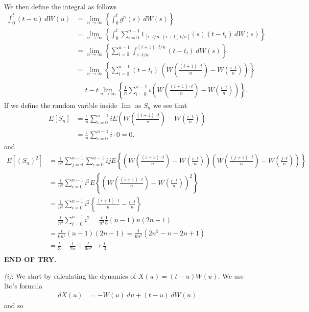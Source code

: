 \documentclass[a4paper,12pt,openany]{book}
\begin{document}
We then define the integral as follows
\begin{align*}
\int_0^t(t-u)\ dW(u)&=\lim_{n\to \infty}\left\{\int_0^tg^n(s)\ dW(s)\right\}\\
&=\lim_{n\to \infty}\left\{\int_0^t \sum_{i=0}^{n-1}1_{[i\cdot t/n,(i+1)t/n]}(s)(t-t_i)\ dW(s)\right\}\\
&=\lim_{n\to \infty}\left\{\sum_{i=0}^{n-1}\int_{i\cdot t/n}^{(i+1)\cdot t/n} (t-t_i)\ dW(s)\right\}\\
&=\lim_{n\to \infty}\left\{\sum_{i=0}^{n-1} (t-t_i)\ \left(W\left(\frac{(i+1)\cdot t}{n}\right)-W\left(\frac{i\cdot t}{n}\right)\right)\right\}\\
&=t-t\lim_{n\to \infty}\left\{\frac{1}{n}\sum_{i=0}^{n-1} i \left(W\left(\frac{(i+1)\cdot t}{n}\right)-W\left(\frac{i\cdot t}{n}\right)\right)\right\}.
\end{align*}
If we define the random varible inside \(\lim\) as \(S_n\) we see that
\begin{align*}
E[S_n]&=\frac{1}{n}\sum_{i=0}^{n-1}iE\left(W\left(\frac{(i+1)\cdot t}{n}\right)-W\left(\frac{i\cdot t}{n}\right)\right)\\
&=\frac{1}{n}\sum_{i=0}^{n-1}i\cdot0=0.
\end{align*}
and
\begin{align*}
E[(S_n)^2]&=\frac{1}{n^2}\sum_{j=0}^{n-1}\sum_{i=0}^{n-1}ijE\left\{\left(W\left(\frac{(i+1)\cdot t}{n}\right)-W\left(\frac{i\cdot t}{n}\right)\right)\left(W\left(\frac{(j+1)\cdot t}{n}\right)-W\left(\frac{j\cdot t}{n}\right)\right)\right\}\\
&=\frac{1}{n^2}\sum_{i=0}^{n-1}i^2E\left\{\left(W\left(\frac{(i+1)\cdot t}{n}\right)-W\left(\frac{i\cdot t}{n}\right)\right)^2\right\}\\
&=\frac{1}{n^2}\sum_{i=0}^{n-1}i^2\left\{\frac{(i+1)\cdot t}{n}-\frac{i\cdot t}{n}\right\}\\
&=\frac{t}{n^3}\sum_{i=0}^{n-1}i^2=\frac{t}{n^3}\frac{1}{6} (n-1) n ( 2 n-1)\\
&=\frac{t}{6n^2}(n-1) ( 2 n-1)=\frac{t}{6n^2}(2n^2-n-2n+1)\\
&=\frac{t}{3}-\frac{t}{2n}+\frac{t}{6n^2}\to \frac{t}{3}\\
\end{align*}
\textbf{END OF TRY.}

\emph{(i)}: We start by calculating the dynamics of \(X(u)=(t-u)W(u)\). We use Ito's formula
\begin{align*}
dX(u)&=-W(u)\ du+(t-u)\ dW(u)
\end{align*}
and so
\end{document}
